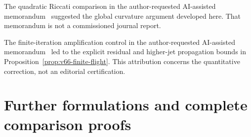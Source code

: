 The quadratic Riccati comparison in the author-requested AI-assisted
memorandum~\cite{A2ReviewV65} suggested the global curvature argument
developed here.  That memorandum is not a commissioned journal report.

The finite-iteration amplification control in the author-requested
AI-assisted memorandum~\cite{A2ReviewV66} led to the explicit residual
and higher-jet propagation bounds in
Proposition~\ref{prop:v66-finite-flight}.  This attribution concerns
the quantitative correction, not an editorial certification.

\appendix
\renewcommand{\thesection}{A.\arabic{section}}
\renewcommand{\theHsection}{appendix.\arabic{section}}
\part{Further formulations and complete comparison proofs}













